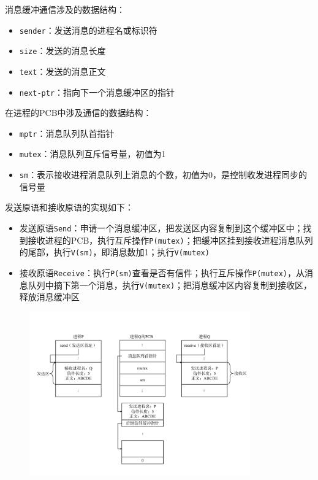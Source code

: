 \documentclass[cs4size,a4paper,10pt]{ctexart}
\begin{document}
	消息缓冲通信涉及的数据结构：
	\begin{itemize}
		\item \verb|sender|：发送消息的进程名或标识符
		\item \verb|size|：发送的消息长度
		\item \verb|text|：发送的消息正文
		\item \verb|next-ptr|：指向下一个消息缓冲区的指针
	\end{itemize}

	在进程的PCB中涉及通信的数据结构：
	\begin{itemize}
		\item \verb|mptr|：消息队列队首指针
		\item \verb|mutex|：消息队列互斥信号量，初值为1
		\item \verb|sm|：表示接收进程消息队列上消息的个数，初值为0，是控制收发进程同步的信号量
	\end{itemize}

	发送原语和接收原语的实现如下：
	\begin{itemize}
		\item 发送原语\verb|Send|：申请一个消息缓冲区，把发送区内容复制到这个缓冲区中；找到接收进程的PCB，执行互斥操作\verb|P(mutex)|；把缓冲区挂到接收进程消息队列的尾部，执行\verb|V(sm)|，即消息数加1；执行\verb|V(mutex)|
		\item 接收原语\verb|Receive|：执行\verb|P(sm)|查看是否有信件；执行互斥操作\verb|P(mutex)|，从消息队列中摘下第一个消息，执行\verb|V(mutex)|；把消息缓冲区内容复制到接收区，释放消息缓冲区
	\end{itemize}

	\begin{figure}[H]
		\centering
		\includegraphics[width=0.85\textwidth]{img/消息缓冲通信.pdf}
	\end{figure}
\end{document}
